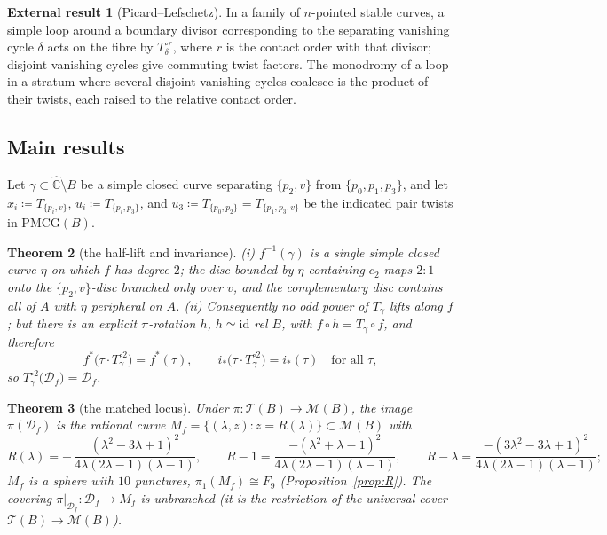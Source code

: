 \documentclass[11pt]{article}
\newtheorem{theorem}{Theorem}[section]
\theoremstyle{definition}
\newtheorem{quoted}[theorem]{External result}
\theoremstyle{remark}
\newcommand{\Teich}{\mathcal T}
\newcommand{\MM}{\mathcal M}
\newcommand{\PMCG}{\mathrm{PMCG}}
\newcommand{\Chat}{\widehat{\mathbb C}}
\newcommand{\Df}{\mathcal D_f}
\begin{document}
\begin{quoted}[Picard--Lefschetz]\label{q:pl}
In a family of $n$-pointed stable curves, a simple loop around a
boundary divisor corresponding to the separating vanishing cycle
$\delta$ acts on the fibre by $T_\delta^{\circ r}$, where $r$ is the
contact order with that divisor; disjoint vanishing cycles give
commuting twist factors.  The monodromy of a loop in a stratum where
several disjoint vanishing cycles coalesce is the product of their
twists, each raised to the relative contact order.
\end{quoted}

\subsection{Main results}

Let $\gamma\subset\Chat\setminus B$ be a simple closed curve separating
$\{p_2,v\}$ from $\{p_0,p_1,p_3\}$, and let $x_i\coloneqq
T_{\{p_i,v\}}$, $u_i\coloneqq T_{\{p_i,p_3\}}$, and
$u_3\coloneqq T_{\{p_0,p_2\}}=T_{\{p_1,p_3,v\}}$ be the indicated pair
twists in $\PMCG(B)$.

\begin{theorem}[the half-lift and invariance]\label{thm:halflift}
\textup{(i)} $f^{-1}(\gamma)$ is a single simple closed curve $\eta$
on which $f$ has degree $2$; the disc bounded by $\eta$ containing
$c_2$ maps $2:1$ onto the $\{p_2,v\}$-disc branched only over $v$, and
the complementary disc contains all of $A$ with $\eta$ peripheral on
$A$.  \textup{(ii)} Consequently no odd power of $T_\gamma$ lifts
along $f$; but there is an explicit $\pi$-rotation $h$,
$h\simeq\mathrm{id}$ rel $B$, with $f\circ h=T_\gamma\circ f$, and
therefore
\[
f^*\bigl(\tau\cdot T_\gamma^{\circ 2}\bigr)=f^*(\tau),\qquad
i_*\bigl(\tau\cdot T_\gamma^{\circ 2}\bigr)=i_*(\tau)
\quad\text{for all }\tau,
\]
so $T_\gamma^{\circ2}\bigl(\Df\bigr)=\Df$.
\end{theorem}


\begin{theorem}[the matched locus]\label{thm:mf}
Under $\pi:\Teich(B)\to\MM(B)$, the image $\pi(\Df)$ is the rational
curve $M_f=\{(\lambda,z):z=R(\lambda)\}\subset\MM(B)$ with
\[
R(\lambda)=-\,\frac{(\lambda^2-3\lambda+1)^2}
{4\lambda(2\lambda-1)(\lambda-1)},\qquad
R-1=\frac{-(\lambda^2+\lambda-1)^2}{4\lambda(2\lambda-1)(\lambda-1)},
\qquad
R-\lambda=\frac{-(3\lambda^2-3\lambda+1)^2}
{4\lambda(2\lambda-1)(\lambda-1)};
\]
$M_f$ is a sphere with $10$ punctures, $\pi_1(M_f)\cong F_9$
\textup{(}Proposition~\ref{prop:R}\textup{)}.  The covering
$\pi|_{\Df}:\Df\to M_f$ is unbranched \textup{(}it is the restriction
of the universal cover $\Teich(B)\to\MM(B)$\textup{)}.
\end{theorem}
\end{document}
